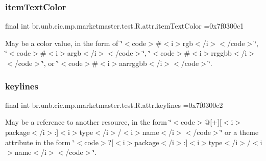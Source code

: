 \subsubsection{\texorpdfstring{item\+Text\+Color}{itemTextColor}}
{\footnotesize\ttfamily final int br.\+unb.\+cic.\+mp.\+marketmaster.\+test.\+R.\+attr.\+item\+Text\+Color =0x7f0300c1\hspace{0.3cm}{\ttfamily [static]}}

May be a color value, in the form of \char`\"{}$<$code$>$\#$<$i$>$rgb$<$/i$>$$<$/code$>$\char`\"{}, \char`\"{}$<$code$>$\#$<$i$>$argb$<$/i$>$$<$/code$>$\char`\"{}, \char`\"{}$<$code$>$\#$<$i$>$rrggbb$<$/i$>$$<$/code$>$\char`\"{}, or \char`\"{}$<$code$>$\#$<$i$>$aarrggbb$<$/i$>$$<$/code$>$\char`\"{}. \mbox{\label{classbr_1_1unb_1_1cic_1_1mp_1_1marketmaster_1_1test_1_1R_1_1attr_a8ed0ddc0ce3f2a07a70f539ab354c38a}} 
\subsubsection{\texorpdfstring{keylines}{keylines}}
{\footnotesize\ttfamily final int br.\+unb.\+cic.\+mp.\+marketmaster.\+test.\+R.\+attr.\+keylines =0x7f0300c2\hspace{0.3cm}{\ttfamily [static]}}

May be a reference to another resource, in the form \char`\"{}$<$code$>$@\mbox{[}+\mbox{]}\mbox{[}$<$i$>$package$<$/i$>$\+:\mbox{]}$<$i$>$type$<$/i$>$/$<$i$>$name$<$/i$>$$<$/code$>$\char`\"{} or a theme attribute in the form \char`\"{}$<$code$>$?\mbox{[}$<$i$>$package$<$/i$>$\+:\mbox{]}$<$i$>$type$<$/i$>$/$<$i$>$name$<$/i$>$$<$/code$>$\char`\"{}. \mbox{\label{classbr_1_1unb_1_1cic_1_1mp_1_1marketmaster_1_1test_1_1R_1_1attr_ac68f09be1f704193550a3e2b2c6a92ef}} 
